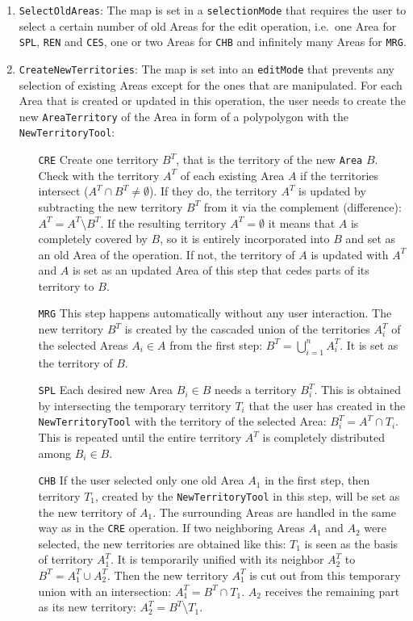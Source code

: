 \begin{enumerate}

  \item \texttt{SelectOldAreas}: The map is set in a \texttt{selectionMode} that requires the user to select a certain number of old Areas for the edit operation, i.e.\ one Area for \texttt{SPL}, \texttt{REN} and \texttt{CES}, one or two Areas for \texttt{CHB} and infinitely many Areas for \texttt{MRG}.

  \item \texttt{CreateNewTerritories}: The map is set into an \texttt{editMode} that prevents any selection of existing Areas except for the ones that are manipulated. For each Area that is created or updated in this operation, the user needs to create the new \texttt{AreaTerritory} of the Area in form of a polypolygon with the \texttt{NewTerritoryTool}:
  \begin{itemize}
    \item[\texttt{CRE}]
      Create one territory $B^T$, that is the territory of the new \texttt{Area} $B$.
      Check with the territory $A^T$ of each existing Area $A$ if the territories intersect ($A^T \cap B^T \neq \emptyset$).
      If they do, the territory $A^T$ is updated by subtracting the new territory $B^T$ from it via the complement (difference): $A^T = A^T \setminus B^T$.
      If the resulting territory $A^T = \emptyset$ it means that $A$ is completely covered by $B$, so it is entirely incorporated into $B$ and set as an old Area of the operation.
      If not, the territory of $A$ is updated with $A^T$ and $A$ is
      set as an updated Area of this step that cedes parts of its territory to $B$.
    \item[\texttt{MRG}]
      This step happens automatically without any user interaction. The new territory $B^T$ is created by the cascaded union of the territories $A^T_i$ of the selected Areas $A_i \in A$ from the first step: $B^T = \bigcup\limits_{i=1}^n A^T_i$. It is set as the territory of $B$.
    \item[\texttt{SPL}]
      Each desired new Area $B_i \in B$ needs a territory $B_i^T$. This is obtained by intersecting the temporary territory $T_i$ that the user has created in the \texttt{NewTerritoryTool} with the territory of the selected Area: $B_i^T = A^T \cap T_i$. This is repeated until the entire territory $A^T$ is completely distributed among $B_i \in B$.
    \item[\texttt{CHB}]
      If the user selected only one old Area $A_1$ in the first step, then territory $T_1$, created by the \texttt{NewTerritoryTool} in this step, will be set as the new territory of $A_1$. The surrounding Areas are handled in the same way as in the \texttt{CRE} operation. If two neighboring Areas $A_1$ and $A_2$ were selected, the new territories are obtained like this: $T_1$ is seen as the basis of territory $A_1^T$. It is temporarily unified with its neighbor $A^T_2$ to $B^T = A_1^T \cup A_2^T$. Then the new territory $A_1^T$ is cut out from this temporary union with an intersection: $A_1^T = B^T \cap T_1$. $A_2$ receives the remaining part as its new territory: $A_2^T = B^T \setminus T_1$.

\end{itemize}
\end{enumerate}
